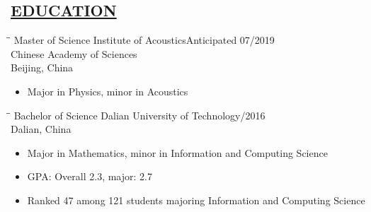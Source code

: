 \documentclass{res} %
\begin{document}

\address{Email: karel.wang@gmail.com, \ Phone: +86 18130056757 
\\
\\
Current Address: University of Chinese Academy of Sciences,\\ \qquad \qquad 
\qquad {} Huaibeizhuang, Huairou District,\\ \qquad \qquad 
\qquad \qquad Beijing, China}

\begin{resume}
\section{\underline{EDUCATION}}


\vspace{-0.02in}	
\begin{tabbing}
    \hspace{2.2in}\= \hspace{2.8in}\= \kill %
    Master of Science   \>Institute of Acoustics\>Anticipated 07/2019  \\
                        \> Chinese Academy of Sciences \>\\
                        \> Beijing, China\>\\
    \end{tabbing}\vspace{-22pt}      %
\vspace{+0.05in}
\begin{itemize}
  \item Major in Physics, minor in Acoustics

\end{itemize}
\vspace{-0.1in}

\vspace{-0.02in}	
\begin{tabbing}
    \hspace{2.2in}\= \hspace{2.8in}\= \kill %
    Bachelor of Science   \>Dalian University of Technology/2016  \\
                        \> Dalian, China \>\\
    \end{tabbing}\vspace{-22pt}      %
\vspace{+0.05in}
\begin{itemize}
  \item Major in Mathematics, minor in Information and Computing Science
  \item GPA: Overall 2.3, major: 2.7
  \item Ranked 47 among 121 students majoring Information and Computing Science
\end{itemize}
\vspace{-0.1in}


\end{resume}
\end{document}
